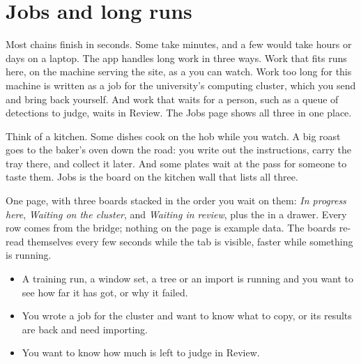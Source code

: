 \chapter{Jobs and long runs}\label{ch:jobs}
Most chains finish in seconds. Some take minutes, and a few would take hours or days on a laptop.
The app handles long work in three ways. Work that fits runs here, on the machine serving the site,
as a  you can watch. Work too long for this machine is written as a job for the
university's computing cluster, which you send and bring back yourself. And work that waits for a
person, such as a queue of detections to judge, waits in Review. The Jobs page shows all three in
one place.

\begin{plainterms}
Think of a kitchen. Some dishes cook on the hob while you watch. A big roast goes to the baker's
oven down the road: you write out the instructions, carry the tray there, and collect it later.
And some plates wait at the pass for someone to taste them. Jobs is the board on the kitchen wall
that lists all three.
\end{plainterms}

One page, with three boards stacked in the order you wait on them: \emph{In progress here},
\emph{Waiting on the cluster}, and \emph{Waiting in review}, plus the  in a drawer.
Every row comes from the bridge; nothing on the page is example data. The boards re-read
themselves every few seconds while the tab is visible, faster while something is running.

\begin{itemize}
\item A training run, a window set, a tree or an import is running and you want to see how far it
  has got, or why it failed.
\item You wrote a job for the cluster and want to know what to copy, or its results are back and
  need importing.
\item You want to know how much is left to judge in Review.
\end{itemize}


